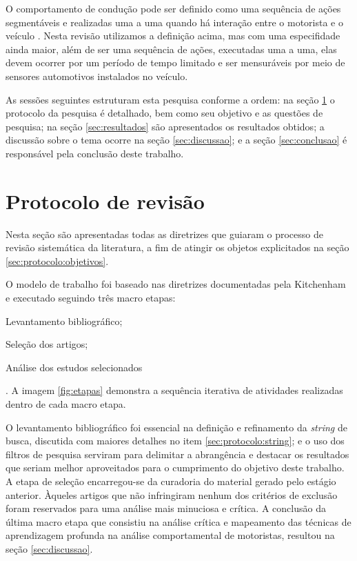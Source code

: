 \documentclass[10pt,journal,compsoc]{IEEEtran}
\begin{document}
O comportamento de condução pode ser definido como uma sequência de
ações segmentáveis e realizadas uma a uma quando há interação entre o motorista e o
veículo \cite{Liu2016}. Nesta revisão
utilizamos a definição acima, mas com uma especifidade ainda maior,
além de ser uma sequência de ações, executadas uma a uma, elas devem
ocorrer por um período de tempo limitado e ser mensuráveis por meio de
sensores automotivos instalados no veículo.

As sessões seguintes estruturam esta pesquisa conforme a ordem: na seção
\ref{sec:protocolo} o protocolo da pesquisa é detalhado, bem como seu
objetivo e as questões de pesquisa; na seção \ref{sec:resultados}
são apresentados os resultados obtidos; a discussão sobre o tema
ocorre na seção \ref{sec:discussao}; e a seção \ref{sec:conclusao} é
responsável pela conclusão deste trabalho.

\section{Protocolo de revisão}
\label{sec:protocolo}
Nesta seção são apresentadas todas as diretrizes que guiaram o
processo de revisão sistemática da literatura, a fim de atingir os
objetos explicitados na seção \ref{sec:protocolo:objetivos}.

O modelo de trabalho foi baseado nas diretrizes
documentadas pela Kitchenham \cite{kitchenham2007} e executado
seguindo três macro etapas:
\begin{enumerate*}
\item Levantamento bibliográfico;
\item Seleção dos artigos;
\item Análise dos estudos selecionados
\end{enumerate*}. A imagem \ref{fig:etapas} demonstra a sequência iterativa de
atividades realizadas dentro de cada macro etapa.

O levantamento bibliográfico foi essencial na definição e refinamento da
\textit{string} de busca, discutida com maiores detalhes no item
\ref{sec:protocolo:string}; e o uso dos filtros de pesquisa serviram
para delimitar a abrangência e destacar os resultados que seriam
melhor aproveitados para o cumprimento do objetivo deste trabalho. A etapa
de seleção encarregou-se da curadoria do material gerado pelo estágio
anterior. Àqueles artigos que não infringiram nenhum dos critérios de
exclusão foram reservados para uma análise mais minuciosa e crítica. A
conclusão da última macro etapa que consistiu na análise crítica e mapeamento das
técnicas de aprendizagem profunda na análise comportamental de
motoristas, resultou na seção \ref{sec:discussao}.
\end{document}
